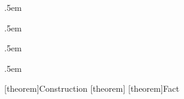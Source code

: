 \ifnum{}
	\ifnum{}
		\let\oldproof\proof
		\renewenvironment{proof}%
		{\begin{oldproof}}%
		{\qed\end{oldproof}}
	\fi
\fi

%
\ifnum{}				%
  {\topsep} %
  {\topsep} %
  {\itshape} %
  {} %
  {\bfseries} %
  {} %
  {.5em} %
  {} %

  {\topsep} %
  {\topsep} %
  {\itshape} %
  {} %
  {\bfseries} %
  {} %
  {.5em} %
  {} %

  {} %
  {} %
  {} %
  {} %
  {\bfseries} %
  {} %
  {.5em} %
  {} %

  {} %
  {} %
  {} %
  {} %
  {\itshape} %
  {} %
  {.5em} %
  {} %

	\theoremstyle{mytheorem}				%
	\newtheorem{theorem}{Theorem}[section]

	\theoremstyle{myplain}
	\newtheorem{lemma}[theorem]{Lemma}
	\newtheorem{corollary}[theorem]{Corollary}
	\newtheorem{proposition}[theorem]{Proposition}
	\newtheorem{construction}[theorem]{Construction}
	\newtheorem{conjecture}[theorem]{Conjecture}

	\theoremstyle{mydefinition}
	\newtheorem{definition}[theorem]{Definition}
	\newtheorem{claim}[theorem]{Claim}
	\newtheorem{assumption}[theorem]{Assumption}
	\newtheorem{fact}[theorem]{Fact}

	\theoremstyle{myremark}
	\newtheorem{remark}[theorem]{Remark}
	\newtheorem{example}[theorem]{Example}
	\newtheorem{note}[theorem]{Note}
	\newtheorem{observation}[theorem]{Observation}
\else									%
	[theorem]{Construction}{\bfseries}{}
	[theorem]{}{\bfseries}{}
	[theorem]{Fact}{\bfseries}{}


